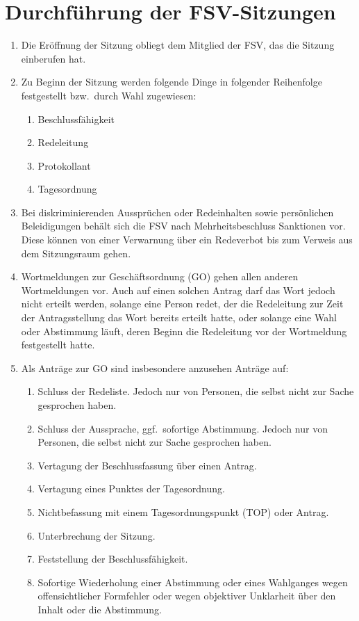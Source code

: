 \documentclass[
	a4paper,
	12pt,
	oneside,
	parskip=half-,
	pagesize,
	headsepline,
	german,
	ngerman
]{scrartcl}
\begin{document}
\section{Durchführung der FSV-Sitzungen}
\begin{enumerate}
	\item Die Eröffnung der Sitzung obliegt dem Mitglied der FSV, das die Sitzung einberufen hat.
	\item Zu Beginn der Sitzung werden folgende Dinge in folgender Reihenfolge festgestellt bzw.\ durch Wahl zugewiesen:
	\begin{enumerate}
		\item Beschlussfähigkeit
		\item Redeleitung
		\item Protokollant
		\item Tagesordnung
	\end{enumerate}
	\item Bei diskriminierenden Aussprüchen oder Redeinhalten sowie persönlichen Beleidigungen behält sich die FSV nach Mehrheitsbeschluss Sanktionen vor. Diese können von einer Verwarnung über ein Redeverbot bis zum Verweis aus dem Sitzungsraum gehen.
	\item Wortmeldungen zur Geschäftsordnung (GO) gehen allen anderen Wortmeldungen vor. Auch auf einen solchen Antrag darf das Wort jedoch nicht erteilt werden, solange eine Person redet, der die Redeleitung zur Zeit der Antragsstellung das Wort bereits erteilt hatte, oder solange eine Wahl oder Abstimmung läuft, deren Beginn die Redeleitung vor der Wortmeldung festgestellt hatte.
	\item Als Anträge zur GO sind insbesondere anzusehen Anträge auf:
	\begin{enumerate}
		\item Schluss der Redeliste. Jedoch nur von Personen, die selbst nicht zur Sache gesprochen haben.
		\item Schluss der Aussprache, ggf.\ sofortige Abstimmung. Jedoch nur von Personen, die selbst nicht zur Sache gesprochen haben.
		\item Vertagung der Beschlussfassung über einen Antrag.
		\item Vertagung eines Punktes der Tagesordnung.
		\item Nichtbefassung mit einem Tagesordnungspunkt (TOP) oder Antrag.
		\item Unterbrechung der Sitzung.
		\item Feststellung der Beschlussfähigkeit.
		\item Sofortige Wiederholung einer Abstimmung oder eines Wahlganges wegen offensichtlicher Formfehler oder wegen objektiver Unklarheit über den Inhalt oder die Abstimmung.

\end{enumerate}
\end{enumerate}
\end{document}
